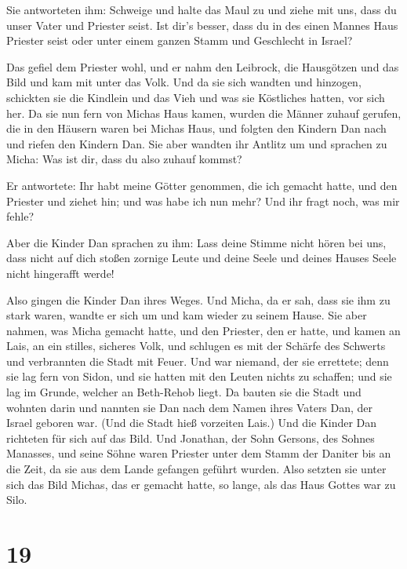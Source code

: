  Sie antworteten ihm: Schweige und halte das Maul zu und
ziehe mit uns, dass du unser Vater und Priester seist. Ist dir's besser,
dass du in des einen Mannes Haus Priester seist oder unter einem ganzen
Stamm und Geschlecht in Israel?

 Das gefiel dem Priester wohl, und er nahm den Leibrock,
die Hausgötzen und das Bild und kam mit unter das Volk. 
Und da sie sich wandten und hinzogen, schickten sie die Kindlein und das
Vieh und was sie Köstliches hatten, vor sich her.  Da sie
nun fern von Michas Haus kamen, wurden die Männer zuhauf gerufen, die in
den Häusern waren bei Michas Haus, und folgten den Kindern Dan nach und
riefen den Kindern Dan.  Sie aber wandten ihr Antlitz um
und sprachen zu Micha: Was ist dir, dass du also zuhauf kommst?

 Er antwortete: Ihr habt meine Götter genommen, die ich
gemacht hatte, und den Priester und ziehet hin; und was habe ich nun
mehr? Und ihr fragt noch, was mir fehle?

 Aber die Kinder Dan sprachen zu ihm: Lass deine Stimme
nicht hören bei uns, dass nicht auf dich stoßen zornige Leute und deine
Seele und deines Hauses Seele nicht hingerafft werde!

 Also gingen die Kinder Dan ihres Weges. Und Micha, da er
sah, dass sie ihm zu stark waren, wandte er sich um und kam wieder zu
seinem Hause.  Sie aber nahmen, was Micha gemacht hatte,
und den Priester, den er hatte, und kamen an Lais, an ein stilles,
sicheres Volk, und schlugen es mit der Schärfe des Schwerts und
verbrannten die Stadt mit Feuer.  Und war niemand, der
sie errettete; denn sie lag fern von Sidon, und sie hatten mit den
Leuten nichts zu schaffen; und sie lag im Grunde, welcher an Beth-Rehob
liegt. Da bauten sie die Stadt und wohnten darin  und
nannten sie Dan nach dem Namen ihres Vaters Dan, der Israel geboren war.
(Und die Stadt hieß vorzeiten Lais.)  Und die Kinder Dan
richteten für sich auf das Bild. Und Jonathan, der Sohn Gersons, des
Sohnes Manasses, und seine Söhne waren Priester unter dem Stamm der
Daniter bis an die Zeit, da sie aus dem Lande gefangen geführt wurden.
 Also setzten sie unter sich das Bild Michas, das er
gemacht hatte, so lange, als das Haus Gottes war zu Silo.

\hypertarget{section-18}{%
\section{19}\label{section-18}}

